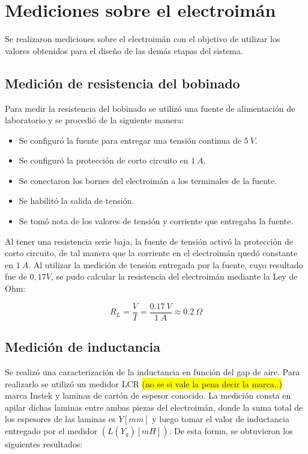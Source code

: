 \section{Mediciones sobre el electroimán}

\noindent Se realizaron mediciones sobre el electroimán con el objetivo de utilizar los valores obtenidos para el diseño de las demás etapas del sistema.

\subsection{Medición de resistencia del bobinado}

\noindent Para medir la resistencia del bobinado se utilizó una fuente de alimentación de laboratorio y se procedió de la siguiente manera:

\begin{itemize}
	\item Se configuró la fuente para entregar una tensión continua de $5\:V$.
	\item Se configuró la protección de corto circuito en $1\:A$.
	\item Se conectaron los bornes del electroimán a los terminales de la fuente.
	\item Se habilitó la salida de tensión.
	\item Se tomó nota de los valores de tensión y corriente que entregaba la fuente.
\end{itemize}

\noindent Al tener una resistencia serie baja, la fuente de tensión activó la protección de corto circuito, de tal manera que la corriente en el electroimán quedó constante en $1\:A$. Al utilizar la medición de tensión entregada por la fuente, cuyo resultado fue de $0,17 V$, se pudo calcular la resistencia del electroimán mediante la Ley de Ohm:

\begin{equation}
	R_{L}=\frac{V}{I}=\frac{0.17\:V}{1\:A}	\approx0.2\:\Omega
\end{equation}

\subsection{Medición de inductancia}

\noindent Se realizó una caracterización de la inductancia en función del gap de aire. Para realizarlo se utilizó un medidor LCR \colorbox{yellow}{(no se si vale la pena decir la marca..)} marca Instek y laminas de cartón de espesor conocido. La medición consta en apilar dichas laminas entre ambas piezas del electroimán, donde la suma total de los espesores de las laminas es $Y[mm]$ y luego tomar el valor de inductancia entregado por el medidor $(L(Y_{g})[mH])$. De esta forma, se obtuvieron los siguientes resultados:

